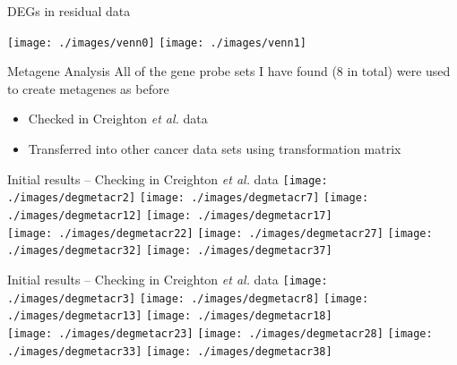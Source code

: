 \documentclass[handout]{beamer}
\begin{document}

\begin{frame}{DEGs in residual data}
	\begin{center}
		\texttt{[image: ./images/venn0]}
		\texttt{[image: ./images/venn1]}
	\end{center}
\end{frame}

\begin{frame}{Metagene Analysis}
	All of the gene probe sets I have found (8 in total) were used to create metagenes as before
	\begin{itemize}
		\item Checked in Creighton \textit{et al.} data
		\item Transferred into other cancer data sets using transformation matrix
	\end{itemize}
\end{frame}

\begin{frame}{Initial results -- Checking in Creighton \textit{et al.} data}
	\texttt{[image: ./images/degmetacr2]}
	\texttt{[image: ./images/degmetacr7]}
	\texttt{[image: ./images/degmetacr12]}
	\texttt{[image: ./images/degmetacr17]}\\
	\texttt{[image: ./images/degmetacr22]}
	\texttt{[image: ./images/degmetacr27]}
	\texttt{[image: ./images/degmetacr32]}
	\texttt{[image: ./images/degmetacr37]}
\end{frame}

\begin{frame}{Initial results -- Checking in Creighton \textit{et al.} data}
	\texttt{[image: ./images/degmetacr3]}
	\texttt{[image: ./images/degmetacr8]}
	\texttt{[image: ./images/degmetacr13]}
	\texttt{[image: ./images/degmetacr18]}\\
	\texttt{[image: ./images/degmetacr23]}
	\texttt{[image: ./images/degmetacr28]}
	\texttt{[image: ./images/degmetacr33]}
	\texttt{[image: ./images/degmetacr38]}
\end{frame}
\end{document}
